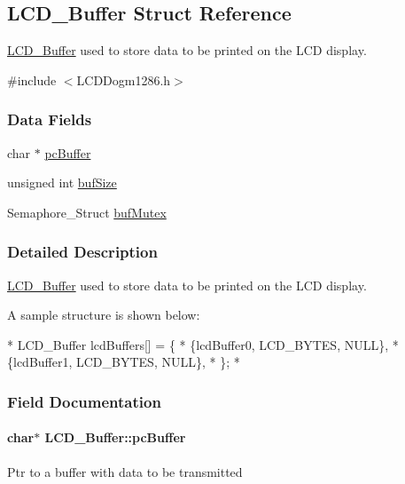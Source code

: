 \subsection{L\-C\-D\-\_\-\-Buffer Struct Reference}
\label{struct_l_c_d___buffer}


\hyperlink{struct_l_c_d___buffer}{L\-C\-D\-\_\-\-Buffer} used to store data to be printed on the L\-C\-D display.  




{\ttfamily \#include $<$L\-C\-D\-Dogm1286.\-h$>$}

\subsubsection*{Data Fields}
\begin{DoxyCompactItemize}
\item 
char $\ast$ \hyperlink{struct_l_c_d___buffer_af0f290cdf7fc2b94ebe0a918cc736982}{pc\-Buffer}
\item 
unsigned int \hyperlink{struct_l_c_d___buffer_a77c4adb59142a732371a552558161ebf}{buf\-Size}
\item 
Semaphore\-\_\-\-Struct \hyperlink{struct_l_c_d___buffer_a48816704d8fb2c059d0c4c2ce3234cd7}{buf\-Mutex}
\end{DoxyCompactItemize}


\subsubsection{Detailed Description}
\hyperlink{struct_l_c_d___buffer}{L\-C\-D\-\_\-\-Buffer} used to store data to be printed on the L\-C\-D display. 

A sample structure is shown below\-: 
\begin{DoxyCode}
*  LCD_Buffer lcdBuffers[] = \{
*      \{lcdBuffer0, LCD_BYTES, NULL\},
*      \{lcdBuffer1, LCD_BYTES, NULL\},
*  \};
*  
\end{DoxyCode}
 

\subsubsection{Field Documentation}
\paragraph[{pc\-Buffer}]{\setlength{\rightskip}{0pt plus 5cm}char$\ast$ L\-C\-D\-\_\-\-Buffer\-::pc\-Buffer}\label{struct_l_c_d___buffer_af0f290cdf7fc2b94ebe0a918cc736982}
Ptr to a buffer with data to be transmitted 
